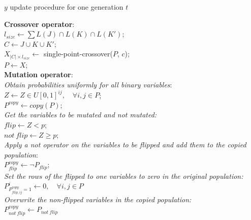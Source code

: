 \documentclass[mscthesis, 11pt]{usiinfthesis}
\theoremstyle{newdefinition}
\begin{document}
\begin{algorithm}
\caption{$y$ update procedure for one generation $t$}\label{alg:bin_update}
\textbf{Crossover operator}:\\
$l_{size} \gets \sum L(J) \cap L(K) \cap L(K')$;\\
$C \gets J \cup K \cup K'$;\\
$X_{|C| \times l_{size}} \gets$ single-point-crossover($P$, $c$);\\
$P \gets X$;\\
\textbf{Mutation operator}:\\
\emph{Obtain probabilities uniformly for all binary variables}:\\
$Z \gets Z \in U[0,1]^{ij}, \quad \forall i, j \in P$;\\
$P^{copy} \gets copy(P)$;\\
\emph{Get the variables to be mutated and not mutated:}\\
$flip \gets Z < p$;\\
$not \: flip \gets Z \geq p$;\\
\emph{Apply a not operator on the variables to be flipped and add them to the copied population}:\\
$P^{copy}_{flip} \gets \neg P_{flip}$;\\
\emph{Set the rows of the flipped to one variables to zero in the original population:}\\
$P^i_{P^{copy}_{flip, ij} = 1} \gets 0, \quad \forall i, j \in P$\\
\emph{Overwrite the non-flipped variables in the copied population:}\\ 
$P^{copy}_{not \: flip} \gets P_{not \: flip}$\\
\end{algorithm}
\clearpage
\end{document}
